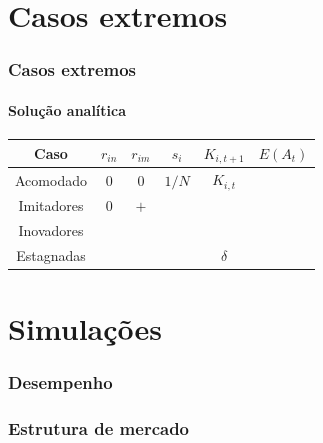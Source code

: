 \documentclass[12pt]{beamer}
\begin{document}
\section{Casos extremos}
\begin{frame}
\frametitle{Casos extremos}
\framesubtitle{Solução analítica}

\begin{table}
\begin{tabular}{c|c|c|c|c|c}
	\hline \hline
	Caso &$r_{in}$&$r_{im}$&$s_i$ & $K_{i,t+1}$ & $E(A_t)$\\ 
	\hline 
	Acomodado & 0 & 0 &$1/N$ & $K_{i,t}$ &\\ 
	\hline 
	Imitadores & 0 & $+$ &  & &\\ 
	\hline 
	Inovadores &  &  &  & &\\ \hline
	Estagnadas &  &  &  &$\delta$ &\\ 
	\hline \hline
\end{tabular} 
\end{table}

\end{frame}

\section{Simulações}


\begin{frame}
\frametitle{Desempenho}
\end{frame}

\begin{frame}
\frametitle{Estrutura de mercado}
\end{frame}
\end{document}
